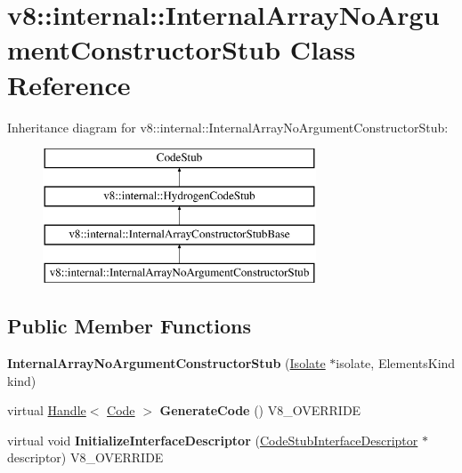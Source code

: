 \hypertarget{classv8_1_1internal_1_1_internal_array_no_argument_constructor_stub}{}\section{v8\+:\+:internal\+:\+:Internal\+Array\+No\+Argument\+Constructor\+Stub Class Reference}
\label{classv8_1_1internal_1_1_internal_array_no_argument_constructor_stub}
Inheritance diagram for v8\+:\+:internal\+:\+:Internal\+Array\+No\+Argument\+Constructor\+Stub\+:\begin{figure}[H]
\begin{center}
\leavevmode
\includegraphics[height=4.000000cm]{classv8_1_1internal_1_1_internal_array_no_argument_constructor_stub}
\end{center}
\end{figure}
\subsection*{Public Member Functions}
\begin{DoxyCompactItemize}
\item 
\hypertarget{classv8_1_1internal_1_1_internal_array_no_argument_constructor_stub_a616841888b251fa41cca1505c9c341da}{}{\bfseries Internal\+Array\+No\+Argument\+Constructor\+Stub} (\hyperlink{classv8_1_1internal_1_1_isolate}{Isolate} $\ast$isolate, Elements\+Kind kind)\label{classv8_1_1internal_1_1_internal_array_no_argument_constructor_stub_a616841888b251fa41cca1505c9c341da}

\item 
\hypertarget{classv8_1_1internal_1_1_internal_array_no_argument_constructor_stub_aa45a4229ed47464e8d312358ddb458c5}{}virtual \hyperlink{classv8_1_1internal_1_1_handle}{Handle}$<$ \hyperlink{classv8_1_1internal_1_1_code}{Code} $>$ {\bfseries Generate\+Code} () V8\+\_\+\+O\+V\+E\+R\+R\+I\+D\+E\label{classv8_1_1internal_1_1_internal_array_no_argument_constructor_stub_aa45a4229ed47464e8d312358ddb458c5}

\item 
\hypertarget{classv8_1_1internal_1_1_internal_array_no_argument_constructor_stub_ac9ff1cbe7fd7c96d0402e07350324bcf}{}virtual void {\bfseries Initialize\+Interface\+Descriptor} (\hyperlink{classv8_1_1internal_1_1_code_stub_interface_descriptor}{Code\+Stub\+Interface\+Descriptor} $\ast$descriptor) V8\+\_\+\+O\+V\+E\+R\+R\+I\+D\+E\label{classv8_1_1internal_1_1_internal_array_no_argument_constructor_stub_ac9ff1cbe7fd7c96d0402e07350324bcf}

\end{DoxyCompactItemize}
